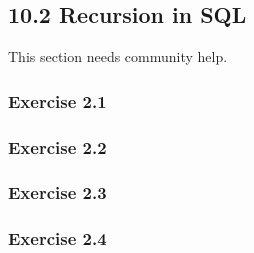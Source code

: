 \documentclass[../../main.tex]{subfiles}
\begin{document}
\subsection{10.2 Recursion in SQL}

This section needs community help.

\subsubsection*{Exercise 2.1}

\subsubsection*{Exercise 2.2}

\subsubsection*{Exercise 2.3}

\subsubsection*{Exercise 2.4}
\end{document}

